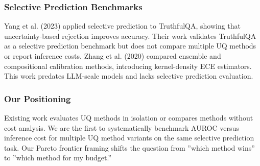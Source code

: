\subsubsection{Selective Prediction Benchmarks}

Yang et al. (2023) applied selective prediction to TruthfulQA, showing that uncertainty-based rejection improves accuracy. Their work validates TruthfulQA as a selective prediction benchmark but does not compare multiple UQ methods or report inference costs. Zhang et al. (2020) compared ensemble and compositional calibration methods, introducing kernel-density ECE estimators. This work predates LLM-scale models and lacks selective prediction evaluation.

\subsubsection{Our Positioning}

Existing work evaluates UQ methods in isolation or compares methods without cost analysis. We are the first to systematically benchmark AUROC versus inference cost for multiple UQ method variants on the same selective prediction task. Our Pareto frontier framing shifts the question from ''which method wins'' to ''which method for my budget.''
